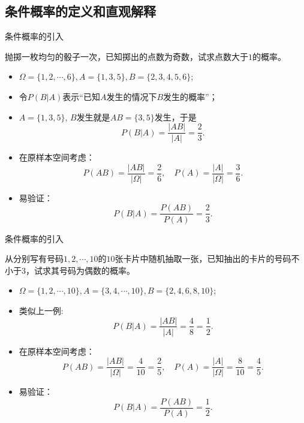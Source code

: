 \subsection{条件概率的定义和直观解释}%
\begin{frame}{条件概率的引入}
	\begin{exam}
		抛掷一枚均匀的骰子一次，已知掷出的点数为奇数，试求点数大于$1$的概率。
	\end{exam}
	\pause

	\vspace{0.2cm}

		\begin{itemize}[<+-|alert@+>]
			\item $\Omega=\{1,2,\cdots,6\}, A=\{1,3,5\}, B=\{2,3,4,5,6\}$;
			\item 令$P(B|A)$表示“已知$A$发生的情况下$B$发生的概率”；%
			\item $A=\{1,3,5\}$, \pause $B$发生就是$AB=\{3,5\}$发生，于是
			$$P(B|A)=\frac{|AB|}{|A|}=\frac{2}{3}.$$\pause
			\item 在原样本空间考虑：
			$$P(AB)=\frac{|AB|}{|\Omega|}=\frac{2}{6},\quad P(A)=\frac{|A|}{|\Omega|}=\frac{3}{6}.$$
			\item 易验证：$$P(B|A)=\frac{P(AB)}{P(A)}=\frac{2}{3}.$$
		\end{itemize}

\end{frame}

\begin{frame}{条件概率的引入}
	\begin{exam}
		从分别写有号码$1,2,\cdots,10$的$10$张卡片中随机抽取一张，已知抽出的卡片的号码不小于$3$，试求其号码为偶数的概率。
	\end{exam}
	\pause
	\vspace{0.2cm}

		\begin{itemize}[<+-|alert@+>]
			\item $\Omega=\{1,2,\cdots,10\}, A=\{3,4,\cdots,10\}, B=\{2,4,6,8,10\}$;
			\item 类似上一例:
			$$P(B|A)=\frac{|AB|}{|A|}=\frac{4}{8}=\frac{1}{2}.$$
			\item 在原样本空间考虑：
			$$P(AB)=\frac{|AB|}{|\Omega|}=\frac{4}{10}=\frac{2}{5},\quad P(A)=\frac{|A|}{|\Omega|}=\frac{8}{10}=\frac{4}{5}.$$
			\item 易验证：$$P(B|A)=\frac{P(AB)}{P(A)}=\frac{1}{2}.$$
		\end{itemize}

\end{frame}

